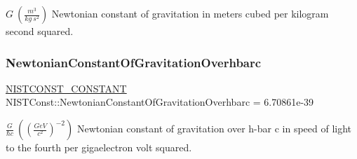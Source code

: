 $G \ (\frac{m^3}{kg\ s^2})$ Newtonian constant of gravitation in meters cubed per kilogram second squared. \mbox{\label{group___n_i_s_t_const-_gravitational_constant_gaab8e9e8695add729258bef9e2fc7e9bf}} 
\subsubsection{\texorpdfstring{Newtonian\+Constant\+Of\+Gravitation\+Overhbarc}{NewtonianConstantOfGravitationOverhbarc}}
{\footnotesize\ttfamily \mbox{\hyperlink{_n_i_s_t_const_8hpp_a2b0fc1d7452373f816175dd86ce26729}{N\+I\+S\+T\+C\+O\+N\+S\+T\+\_\+\+C\+O\+N\+S\+T\+A\+NT}} N\+I\+S\+T\+Const\+::\+Newtonian\+Constant\+Of\+Gravitation\+Overhbarc = 6.\+70861e-\/39}

$\frac{G}{\hbar c} \ ((\frac{GeV}{c^2})^{-2})$ Newtonian constant of gravitation over h-\/bar c in speed of light to the fourth per gigaelectron volt squared. 